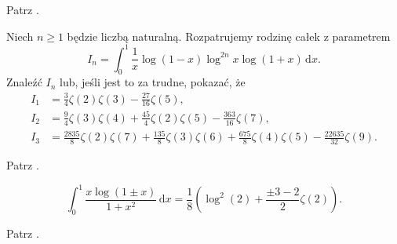 
\begin{solution}
    Patrz \cite[s. 4, 5]{valean19}.
\end{solution}

\begin{problem_with_solution}
    \label{valean_1_10}%
    Niech $n \ge 1$ będzie liczbą naturalną.
    Rozpatrujemy rodzinę całek z parametrem
    \begin{equation}
        I_n = \int_0^1 \frac 1 x \log(1-x) \log^{2n} x \log (1+x) \,\mathrm{d}x.
    \end{equation}
    Znaleźć $I_n$ lub, jeśli jest to za trudne, pokazać, że
    \begin{align}
        I_1 & = \frac 3 4 \zeta (2) \zeta (3) - \frac {27}{16} \zeta(5), \\
        I_2 & = \frac 9 4 \zeta (3) \zeta (4) + \frac{45}{4} \zeta(2) \zeta(5) - \frac{363}{16} \zeta (7), \\
        I_3 & = \frac{2835}{8} \zeta(2) \zeta (7) + \frac {135}{8} \zeta (3) \zeta (6) + \frac {675}{8} \zeta (4) \zeta (5) - \frac {22635}{32} \zeta (9).
    \end{align} 
\end{problem_with_solution}


\begin{solution}
    Patrz \cite[s. 6, 7]{valean19}.
\end{solution}

\begin{problem_with_solution}
    \label{valean_1_13}%
    \begin{equation}
        \int_0^1 \frac{x \log (1 \pm x)}{1 + x^2} \, \mathrm{d} x = \frac 1 8 \left(\log^2 (2) + \frac{\pm 3 - 2}{2} \zeta(2)\right).
    \end{equation} 
\end{problem_with_solution}


\begin{solution}
    Patrz \cite[s. 8]{valean19}.
\end{solution}

